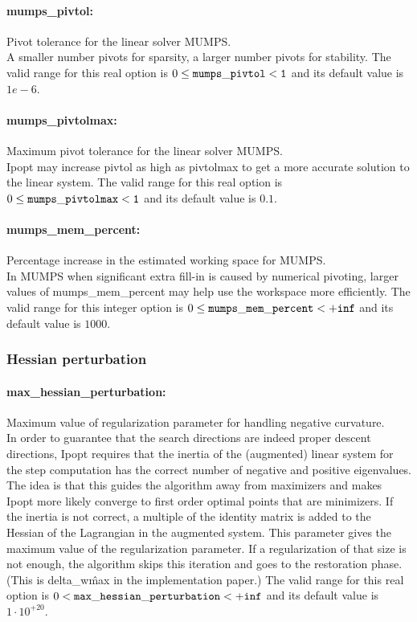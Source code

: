 \paragraph{mumps\_pivtol:} Pivot tolerance for the linear solver MUMPS. \\
A smaller number pivots for sparsity, a larger number pivots for stability.
The valid range for this real option is
$0 \le {\tt mumps\_pivtol } < {\tt 1}$
and its default value is $1e-6$.

\paragraph{mumps\_pivtolmax:} Maximum pivot tolerance for the linear solver MUMPS. \\
Ipopt may increase pivtol as high as pivtolmax to get a more accurate solution to the linear system.
The valid range for this real option is
$0 \le {\tt mumps\_pivtolmax } < {\tt 1}$
and its default value is $0.1$.

\paragraph{mumps\_mem\_percent:} Percentage increase in the estimated working space for MUMPS. \\
In MUMPS when significant extra fill-in is caused by numerical pivoting, larger values of mumps\_mem\_percent may help use the workspace more efficiently.
The valid range for this integer option is
$0 \le {\tt mumps\_mem\_percent } < {\tt +inf}$
and its default value is $1000$.

\subsubsection{Hessian perturbation}

\paragraph{max\_hessian\_perturbation:} Maximum value of regularization parameter for handling negative curvature. $\;$ \\
 In order to guarantee that the search directions
are indeed proper descent directions, Ipopt
requires that the inertia of the (augmented)
linear system for the step computation has the
correct number of negative and positive
eigenvalues. The idea is that this guides the
algorithm away from maximizers and makes Ipopt
more likely converge to first order optimal
points that are minimizers. If the inertia is not
correct, a multiple of the identity matrix is
added to the Hessian of the Lagrangian in the
augmented system. This parameter gives the
maximum value of the regularization parameter. If
a regularization of that size is not enough, the
algorithm skips this iteration and goes to the
restoration phase. (This is delta\_w\^max in the
implementation paper.) The valid range for this real option is 
$0 <  {\tt max\_hessian\_perturbation } <  {\tt +inf}$
and its default value is $1 \cdot 10^{+20}$.


